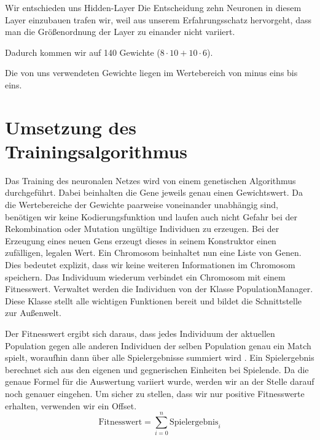 \documentclass[
	12pt,
	a4paper,
	BCOR10mm,
	DIV14,
	headsepline,
	usegeometry,
]{scrreprt}
\begin{document}
Wir entschieden uns  Hidden-Layer 
Die Entscheidung zehn Neuronen in diesem Layer einzubauen trafen wir, weil aus unserem Erfahrungsschatz hervorgeht, dass man die Größenordnung der Layer zu einander nicht variiert.

Dadurch kommen wir auf 140 Gewichte ($8 \cdot 10 + 10 \cdot 6$).

Die von uns verwendeten Gewichte liegen im Wertebereich von minus eins bis eins.

\section{Umsetzung des Trainingsalgorithmus}
Das Training des neuronalen Netzes wird von einem genetischen Algorithmus durchgeführt.
Dabei beinhalten die Gene jeweils genau einen Gewichtswert.
Da die Wertebereiche der Gewichte paarweise voneinander unabhängig sind, benötigen wir keine Kodierungsfunktion und laufen auch nicht Gefahr bei der Rekombination oder Mutation ungültige Individuen zu erzeugen.
Bei der Erzeugung eines neuen Gens erzeugt dieses in seinem Konstruktor einen zufälligen, legalen Wert.
Ein Chromosom beinhaltet nun eine Liste von Genen.
Dies bedeutet explizit, dass wir keine weiteren Informationen im Chromosom speichern.
Das Individuum wiederum verbindet ein Chromosom mit einem Fitnesswert.
Verwaltet werden die Individuen von der Klasse PopulationManager.
Diese Klasse stellt alle wichtigen Funktionen bereit und bildet die Schnittstelle zur Außenwelt.

Der Fitnesswert ergibt sich daraus, dass jedes Individuum der aktuellen Population gegen alle anderen Individuen der selben Population genau ein Match spielt, woraufhin dann über alle Spielergebnisse summiert wird .
Ein Spielergebnis berechnet sich aus den eigenen und gegnerischen Einheiten bei Spielende.
Da die genaue Formel für die Auswertung variiert wurde, werden wir an der Stelle darauf noch genauer eingehen.
Um sicher zu stellen, dass wir nur positive Fitnesswerte erhalten, verwenden wir ein Offset.
\begin{equation}\label{eq:fitness}
	\text{Fitnesswert} = \sum_{i=0}^n{\text{Spielergebnis}_{i}}
\end{equation}
\end{document}
